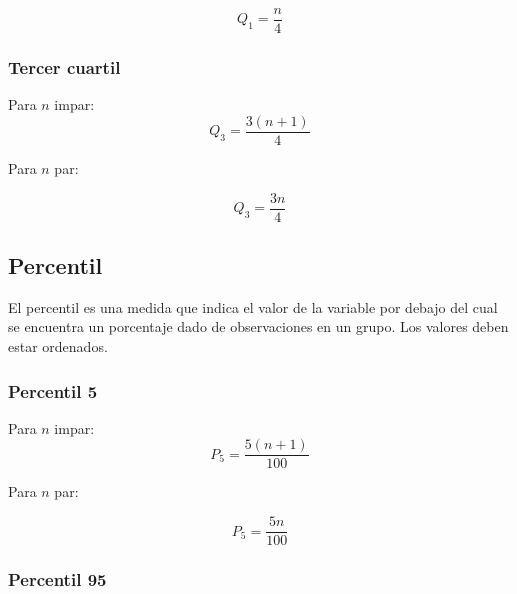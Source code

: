 \documentclass{report}
\begin{document}
            \begin{equation*}
              Q_1=\frac{n}{4}
            \end{equation*}

          \subsubsection*{Tercer cuartil}
            
            \indent Para $n$ impar:
            \begin{equation*}
              Q_3=\frac{3(n+1)}{4}
            \end{equation*}

            Para $n$ par:

            \begin{equation*}
              Q_3=\frac{3n}{4}
            \end{equation*} 

        \subsection*{Percentil}
          El percentil es una medida que indica el valor de la variable por debajo 
          del cual se encuentra un porcentaje dado de observaciones en un grupo.
          Los valores deben estar ordenados.

          \subsubsection*{Percentil 5}

            \indent Para $n$ impar:
            \begin{equation*}
              P_5=\frac{5(n+1)}{100}
            \end{equation*}

            Para $n$ par:

            \begin{equation*}
              P_5=\frac{5n}{100}
            \end{equation*}

          \subsubsection*{Percentil 95}
\end{document}
